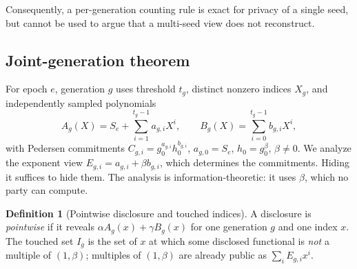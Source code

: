 \documentclass[pdflatex,sn-mathphys-num]{sn-jnl}%
\theoremstyle{plain}
\theoremstyle{definition}
\newtheorem{definition}[theorem]{Definition}
\begin{document}
Consequently, a per-generation counting rule is exact for privacy of a single seed, but cannot be used to argue that a multi-seed view does not reconstruct.

\subsection{Joint-generation theorem}
For epoch $e$, generation $g$ uses threshold $t_g$, distinct nonzero indices $X_g$, and independently sampled polynomials
\begin{equation}\label{eq:sharing}
 A_g(X)=S_e+\sum_{i=1}^{t_g-1}a_{g,i}X^i,\qquad
 B_g(X)=\sum_{i=0}^{t_g-1}b_{g,i}X^i,
\end{equation}
with Pedersen commitments $C_{g,i}=g_0^{a_{g,i}}h_0^{b_{g,i}}$, $a_{g,0}=S_e$, $h_0=g_0^\beta$, $\beta\ne0$. We analyze the exponent view $E_{g,i}=a_{g,i}+\beta b_{g,i}$, which determines the commitments. Hiding it suffices to hide them. The analysis is information-theoretic: it uses $\beta$, which no party can compute.

\begin{definition}[Pointwise disclosure and touched indices]
A disclosure is \emph{pointwise} if it reveals $\alpha A_g(x)+\gamma B_g(x)$ for one generation $g$ and one index $x$. The touched set $I_g$ is the set of $x$ at which some disclosed functional is \emph{not} a multiple of $(1,\beta)$; multiples of $(1,\beta)$ are already public as $\sum_iE_{g,i}x^i$.
\end{definition}
\end{document}

